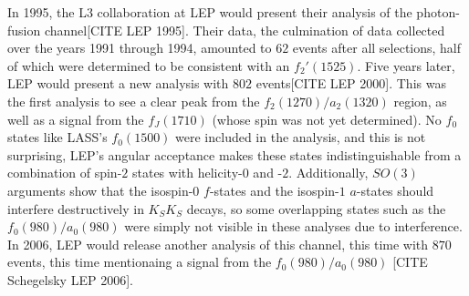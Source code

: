 In 1995, the L3 collaboration at LEP would present their analysis of the photon-fusion channel{\color{red}[CITE LEP 1995]}. Their data, the culmination of data collected over the years 1991 through 1994, amounted to $62$ events after all selections, half of which were determined to be consistent with an $f_2'(1525)$. Five years later, LEP would present a new analysis with $802$ events{\color{red}[CITE LEP 2000]}. This was the first analysis to see a clear peak from the $f_2(1270)/a_2(1320)$ region, as well as a signal from the $f_J(1710)$ (whose spin was not yet determined). No $f_0$ states like LASS's $f_0(1500)$ were included in the analysis, and this is not surprising, LEP's angular acceptance makes these states indistinguishable from a combination of spin-$2$ states with helicity-$0$ and -$2$. Additionally, $SO(3)$ arguments show that the isospin-$0$ $f$-states and the isospin-$1$ $a$-states should interfere destructively in $K_SK_S$ decays, so some overlapping states such as the $f_0(980)/a_0(980)$ were simply not visible in these analyses due to interference. In 2006, LEP would release another analysis of this channel, this time with $870$ events, this time mentionaing a signal from the $f_0(980)/a_0(980)$ {\color{red}[CITE Schegelsky LEP 2006]}. 

